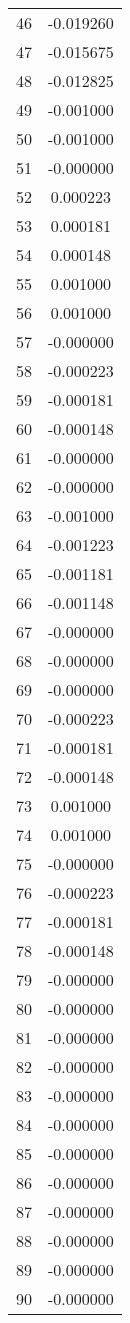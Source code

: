 \documentclass[12pt]{article}
\begin{document}
\begin{longtable}{@{}cc@{}}
46 & -0.019260 \\
47 & -0.015675 \\
48 & -0.012825 \\
49 & -0.001000 \\
50 & -0.001000 \\
51 & -0.000000 \\
52 & 0.000223 \\
53 & 0.000181 \\
54 & 0.000148 \\
55 & 0.001000 \\
56 & 0.001000 \\
57 & -0.000000 \\
58 & -0.000223 \\
59 & -0.000181 \\
60 & -0.000148 \\
61 & -0.000000 \\
62 & -0.000000 \\
63 & -0.001000 \\
64 & -0.001223 \\
65 & -0.001181 \\
66 & -0.001148 \\
67 & -0.000000 \\
68 & -0.000000 \\
69 & -0.000000 \\
70 & -0.000223 \\
71 & -0.000181 \\
72 & -0.000148 \\
73 & 0.001000 \\
74 & 0.001000 \\
75 & -0.000000 \\
76 & -0.000223 \\
77 & -0.000181 \\
78 & -0.000148 \\
79 & -0.000000 \\
80 & -0.000000 \\
81 & -0.000000 \\
82 & -0.000000 \\
83 & -0.000000 \\
84 & -0.000000 \\
85 & -0.000000 \\
86 & -0.000000 \\
87 & -0.000000 \\
88 & -0.000000 \\
89 & -0.000000 \\
90 & -0.000000 \\

\end{longtable}
\end{document}
